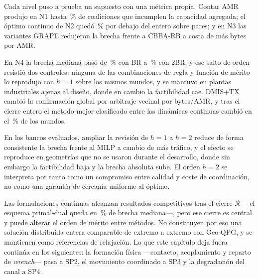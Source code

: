 \documentclass[12pt,a4paper]{article}
\theoremstyle{remark}
\theoremstyle{plain}
\begin{document}
Cada nivel puso a prueba un supuesto con una métrica propia. Contar AMR produjo
en N1 hasta \NOneExtremeFalsePct\,\% de coaliciones que incumplen la capacidad
agregada; el óptimo continuo de N2 quedó \NTwoGapPct\,\% por debajo del entero
sobre \NTwoAtomicityComparable{} pares; y en N3 las variantes GRAPE redujeron la
brecha frente a CBBA-RB a costa de más bytes por AMR.

En N4 la brecha mediana pasó de \SPoneBRGapCommon\,\% con BR a
\SPoneTwoBRGapCommon\,\% con 2BR, y ese salto de orden resistió dos controles:
ninguna de las \NThreeBUnilateralCells{} combinaciones de regla y función de
mérito lo reprodujo con $h=1$ sobre los mismos mundos, y se mantuvo en
\NFourHLayouts{} plantas industriales ajenas al diseño, donde en cambio la
factibilidad cae. DMIS+TX cambió la confirmación global por arbitraje vecinal
por \SPoneDmisBytesDeltaCert{} bytes/AMR, y tras el cierre entero el método
mejor clasificado entre las dinámicas continuas cambió en el
\NFourFiiMismatchPct\,\% de los mundos.

En los bancos evaluados, ampliar la revisión de $h=1$ a $h=2$ reduce de forma
consistente la brecha frente al MILP a cambio de más tráfico, y el efecto se
reproduce en geometrías que no se usaron durante el desarrollo, donde sin
embargo la factibilidad baja y la brecha absoluta sube. El orden $h=2$ se
interpreta por tanto como un compromiso entre calidad y coste de coordinación,
no como una garantía de cercanía uniforme al óptimo.

Las formulaciones continuas alcanzan resultados competitivos tras el cierre
$\mathcal R$ ---el esquema primal-dual queda en \NFourPdClosedGapPct\,\% de
brecha mediana---, pero ese cierre es central y puede alterar el orden de mérito
entre métodos. No constituyen por eso una solución distribuida entera comparable
de extremo a extremo con Geo-QPG, y se mantienen como referencias de relajación.
Lo que este capítulo deja fuera continúa en los siguientes: la formación física
---contacto, acoplamiento y reparto de \emph{wrench}--- pasa a SP2, el movimiento
coordinado a SP3 y la degradación del canal a SP4.

\newpage
\appendix
\setcounter{section}{0}
\newcommand{\latinalph}[1]{%
  \ifcase#1\or A\or B\or C\or D\or E\or F\or G\or H\or I\or J\or K%
  \or L\or M\or N\or O\or P\or Q\or R\or S\or T\or U\or V\or W%
  \or X\or Y\or Z\fi}
\renewcommand{\thesection}{\latinalph{\value{section}}}

\end{document}
